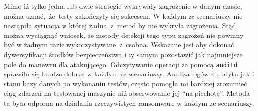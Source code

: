 Mimo iż tylko jedna lub dwie strategie wykrywały zagrożenie w danym czasie, można uznać,~że~testy zakończyły się sukcesem. W każdym ze scenariuszy nie nastąpiła sytuacja w której żadna~z~metod by nie wykryła zagrożenia. Stąd można wyciągnąć wniosek, że metody detekcji tego typu zagrożeń nie powinny być w żadnym razie wykorzystywane~z~osobna. Wskazane jest aby dokonać dywersyfikacji środków bezpieczeństwa i ty samym pozostawić jak najmniejsze pole do manewru dla atakującego.
\newline
Odczytywanie operacji za pomocą \texttt{auditd} sprawiło się bardzo dobrze w każdym ze scenariuszy. Analiza logów z audytu jak i stanu bazy danych po wykonaniu testów, często pomogła mi bardziej zrozumieć ciąg zdarzeń na testowanej maszynie niż obserwowanie jej \enquote{na piechotę}. Metoda ta była odporna na działania rzeczywistych ransomware w każdym ze scenariuszy.
